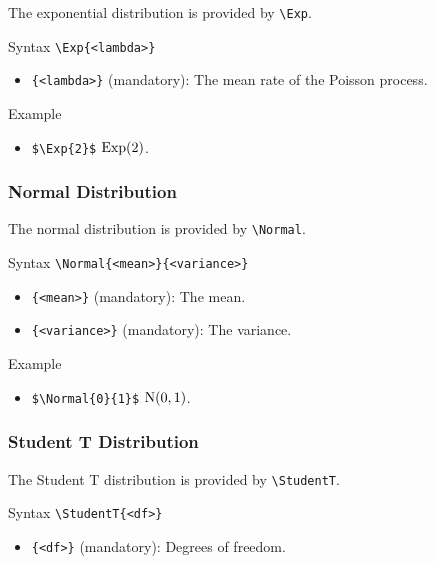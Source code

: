The exponential distribution is provided by \verb|\Exp|.

\begin{myframe}{Syntax }
    \verb|\Exp{<lambda>}|
    \begin{itemize}
        \item \verb|{<lambda>}| (mandatory): The mean rate of the Poisson process.
    \end{itemize}
\end{myframe}

\begin{myframe}{Example }
    \begin{itemize}
        \item \verb|$\Exp{2}$| \produces{} ${\mathrm{Exp}}{\left( 2 \right)}$.
    \end{itemize}
\end{myframe}

\subsubsection{Normal Distribution}

The normal distribution is provided by \verb|\Normal|.

\begin{myframe}{Syntax }
    \verb|\Normal{<mean>}{<variance>}|
    \begin{itemize}
        \item \verb|{<mean>}| (mandatory): The mean.
        \item \verb|{<variance>}| (mandatory): The variance.
    \end{itemize}
\end{myframe}

\begin{myframe}{Example }
    \begin{itemize}
        \item \verb|$\Normal{0}{1}$| \produces{} ${\mathrm{N}}{\left( 0, 1 \right)}$.
    \end{itemize}
\end{myframe}

\subsubsection{Student T Distribution}

The Student T distribution is provided by \verb|\StudentT|.

\begin{myframe}{Syntax }
    \verb|\StudentT{<df>}|
    \begin{itemize}
        \item \verb|{<df>}| (mandatory): Degrees of freedom.
    \end{itemize}
\end{myframe}

